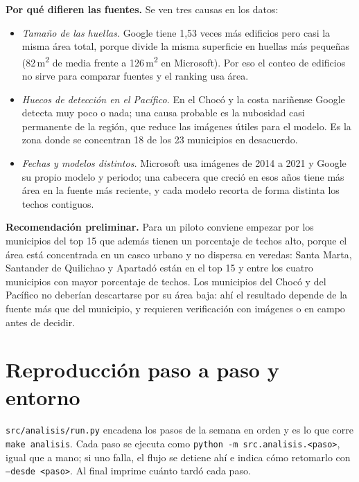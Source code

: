 \documentclass[11pt,a4paper]{article}
\newcommand{\campo}[1]{\texttt{#1}}
\begin{document}
\textbf{Por qué difieren las fuentes.} Se ven tres causas en los datos:
\begin{itemize}
  \item \emph{Tamaño de las huellas.} Google tiene 1,53 veces más edificios pero
        casi la misma área total, porque divide la misma superficie en huellas
        más pequeñas (82\,m\textsuperscript{2} de media frente a
        126\,m\textsuperscript{2} en Microsoft). Por eso el conteo de
        edificios no sirve para comparar fuentes y el ranking usa área.
  \item \emph{Huecos de detección en el Pacífico.} En el Chocó y la costa
        nariñense Google detecta muy poco o nada; una causa probable es la nubosidad casi
        permanente de la región, que reduce las imágenes útiles para el modelo. Es la
        zona donde se concentran 18 de los 23 municipios en desacuerdo.
  \item \emph{Fechas y modelos distintos.} Microsoft usa imágenes de 2014 a 2021
        y Google su propio modelo y periodo; una cabecera que creció en esos
        años tiene más área en la fuente más reciente, y cada modelo recorta
        de forma distinta los techos contiguos.
\end{itemize}

\textbf{Recomendación preliminar.} Para un piloto conviene empezar por los
municipios del top 15 que además tienen un porcentaje de techos alto, porque
el área está concentrada en un casco urbano y no dispersa en veredas:
Santa Marta, Santander de Quilichao y Apartadó están en el top 15 y entre
los cuatro municipios con mayor porcentaje de techos. Los municipios del Chocó y del Pacífico no deberían descartarse
por su área baja: ahí el resultado depende de la fuente más que del municipio,
y requieren verificación con imágenes o en campo antes de decidir.

\section{Reproducción paso a paso y entorno}
\label{sec:reproduccion}

\campo{src/analisis/run.py} encadena los pasos de la semana en orden y es lo
que corre \campo{make analisis}. Cada paso se ejecuta como
\campo{python -m src.analisis.<paso>}, igual que a mano; si uno falla, el
flujo se detiene ahí e indica cómo retomarlo con \campo{--desde <paso>}. Al
final imprime cuánto tardó cada paso.
\end{document}
